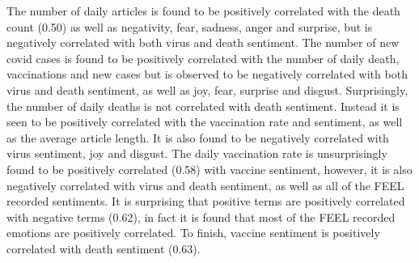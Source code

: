 The number of daily articles is found to be positively correlated with the death count (0.50) as well as negativity, fear, sadness, anger and surprise, but is negatively correlated with both virus and death sentiment. The number of new covid cases is found to be positively correlated with the number of daily death, vaccinations and new cases but is observed to be negatively correlated with both virus and death sentiment, as well as joy, fear, surprise and disgust. Surprisingly, the number of daily deaths is not correlated with death sentiment. Instead it is seen to be positively correlated with the vaccination rate and sentiment, as well as the average article length. It is also found to be negatively correlated with virus sentiment, joy and disgust. The daily vaccination rate is unsurprisingly found to be positively correlated (0.58) with vaccine sentiment, however, it is also negatively correlated with virus and death sentiment, as well as all of the FEEL recorded sentiments. It is surprising that positive terms are positively correlated with negative terms (0.62), in fact it is found that most of the FEEL recorded emotions are positively correlated. To finish, vaccine sentiment is positively correlated with death sentiment (0.63).


